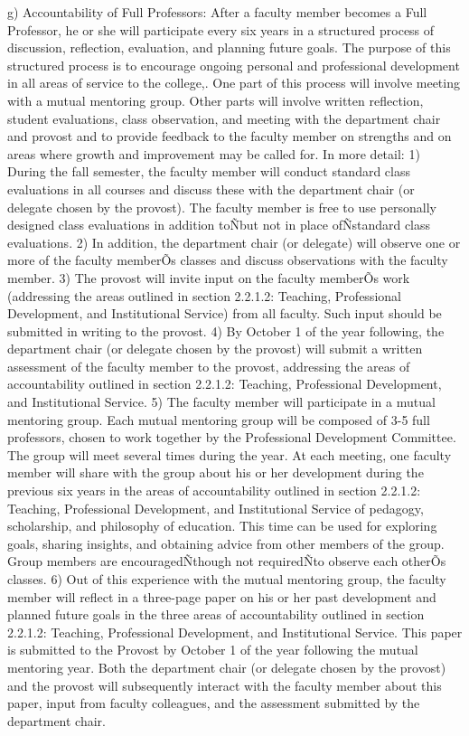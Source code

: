 \documentclass[letterpaper, 11pt]{article}
\begin{document}
			g) Accountability of Full Professors:  After a faculty member becomes a Full Professor, he or she will participate every six years in a structured process of discussion, reflection, evaluation, and planning future goals. The purpose of this structured process is to encourage ongoing personal and professional development in all areas of service to the college,. One part of this process will involve meeting with a mutual mentoring group. Other parts will involve written reflection, student evaluations, class observation, and meeting with the department chair and provost and to provide feedback to the faculty member on strengths and on areas where growth and improvement may be called for. In more detail:
			1) During the fall semester, the faculty member will conduct standard class evaluations in all courses and discuss these with the department chair (or delegate chosen by the provost). The faculty member is free to use personally designed class evaluations in addition toÑbut not in place ofÑstandard class evaluations.
			2) In addition, the department chair (or delegate) will observe one or more of the faculty memberÕs classes and discuss observations with the faculty member.
			3) The provost will invite input on the faculty memberÕs work (addressing the areas outlined in section 2.2.1.2: Teaching, Professional Development, and Institutional Service) from all faculty. Such input should be submitted in writing to the provost.
			4) By October 1 of the year following, the department chair (or delegate chosen by the provost) will submit a written assessment of the faculty member to the provost, addressing the areas of accountability outlined in section 2.2.1.2: Teaching, Professional Development, and Institutional Service.
			5) The faculty member will participate in a mutual mentoring group. Each mutual mentoring group will be composed of 3-5 full professors, chosen to work together by the Professional Development Committee. The group will meet several times during the year. At each meeting, one faculty member will share with the group about his or her development during the previous six years in the areas of accountability outlined in section 2.2.1.2: Teaching, Professional Development, and Institutional Service of pedagogy, scholarship, and philosophy of education. This time can be used for exploring goals, sharing insights, and obtaining advice from other members of the group. Group members are encouragedÑthough not requiredÑto observe each otherÕs classes.
			6) Out of this experience with the mutual mentoring group, the faculty member will reflect in a three-page paper on his or her past development and planned future goals in the three areas of accountability outlined in section 2.2.1.2: Teaching, Professional Development, and Institutional Service. This paper is submitted to the Provost by October 1 of the year following the mutual mentoring year. Both the department chair (or delegate chosen by the provost) and the provost will subsequently interact with the faculty member about this paper, input from faculty colleagues, and the assessment submitted by the department chair.
\end{document}
